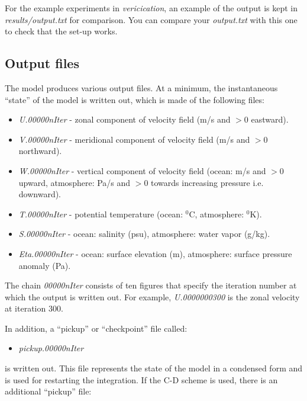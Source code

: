 For the example experiments in {\em vericication}, an example of the
output is kept in {\em results/output.txt} for comparison. You can compare
your {\em output.txt} with this one to check that the set-up works.



\subsection{Output files}

The model produces various output files. At a minimum, the instantaneous
``state'' of the model is written out, which is made of the following files:

\begin{itemize}
\item \textit{U.00000nIter} - zonal component of velocity field (m/s and $>
0 $ eastward).

\item \textit{V.00000nIter} - meridional component of velocity field (m/s
and $> 0$ northward).

\item \textit{W.00000nIter} - vertical component of velocity field (ocean:
m/s and $> 0$ upward, atmosphere: Pa/s and $> 0$ towards increasing pressure
i.e. downward).

\item \textit{T.00000nIter} - potential temperature (ocean: $^{0}$C,
atmosphere: $^{0}$K).

\item \textit{S.00000nIter} - ocean: salinity (psu), atmosphere: water vapor
(g/kg).

\item \textit{Eta.00000nIter} - ocean: surface elevation (m), atmosphere:
surface pressure anomaly (Pa).
\end{itemize}

The chain \textit{00000nIter} consists of ten figures that specify the
iteration number at which the output is written out. For example, \textit{%
U.0000000300} is the zonal velocity at iteration 300.

In addition, a ``pickup'' or ``checkpoint'' file called:

\begin{itemize}
\item \textit{pickup.00000nIter}
\end{itemize}

is written out. This file represents the state of the model in a condensed
form and is used for restarting the integration. If the C-D scheme is used,
there is an additional ``pickup'' file:

